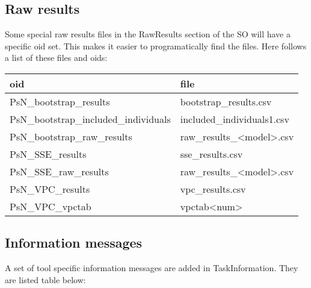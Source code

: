 \subsection{Raw results}
Some special raw results files in the RawResults section of the SO will have a specific oid set. This makes it easier to programatically find the files. Here follows a list of these files and oids:

\begin{tabular}{ l l}
      oid & file \\
    \hline
      PsN\_bootstrap\_results & bootstrap\_results.csv \\
      PsN\_bootstrap\_included\_individuals & included\_individuals1.csv \\
      PsN\_bootstrap\_raw\_results & raw\_results\_<model>.csv \\
      PsN\_SSE\_results & sse\_results.csv \\
      PsN\_SSE\_raw\_results & raw\_results\_<model>.csv \\
      PsN\_VPC\_results & vpc\_results.csv \\
      PsN\_VPC\_vpctab & vpctab<num> \\
\end{tabular}



\subsection{Information messages}
A set of tool specific information messages are added in TaskInformation. They are listed table below:

